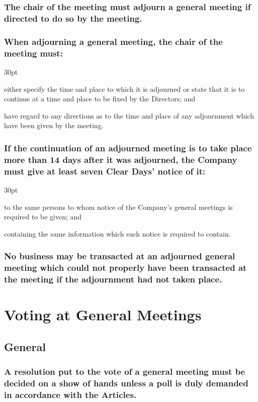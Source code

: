 \documentclass[12pt]{article}
\def\clauseindent{30pt}
\newenvironment{subindentpara}{\begin{adjustwidth}{\clauseindent}{}\begin{hanginglist}}{\end{hanginglist}\end{adjustwidth}}
\begin{document}
\subsubsection{The chair of the meeting must adjourn a general meeting if directed to do so by the meeting.}
\subsubsection{When adjourning a general meeting, the chair of the meeting must:}
\begin{subindentpara}
    \item either specify the time and place to which it is adjourned or state that it is to continue at a time and place to be fixed by the Directors; and
    \item have regard to any directions as to the time and place of any adjournment which have been given by the meeting.
\end{subindentpara}
\subsubsection{If the continuation of an adjourned meeting is to take place more than 14 days after it was adjourned, the Company must give at least seven Clear Days’ notice of it:}
\begin{subindentpara}
    \item to the same persons to whom notice of the Company’s general meetings is required to be given; and
    \item containing the same information which such notice is required to contain.
\end{subindentpara}
\subsubsection{No business may be transacted at an adjourned general meeting which could not properly have been transacted at the meeting if the adjournment had not taken place.}

\section*{Voting at General Meetings}
\subsection{General}
\subsubsection{A resolution put to the vote of a general meeting must be decided on a show of hands unless a poll is duly demanded in accordance with the Articles.}
\end{document}

